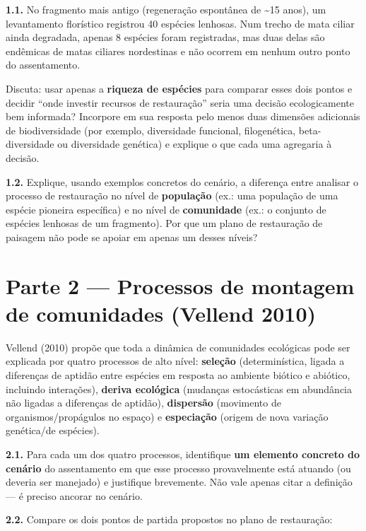 \documentclass[
  brazilian,
  letterpaper,
  DIV=11,
  numbers=noendperiod]{scrartcl}
\begin{document}
\textbf{1.1.} No fragmento mais antigo (regeneração espontânea de
\textasciitilde15 anos), um levantamento florístico registrou 40
espécies lenhosas. Num trecho de mata ciliar ainda degradada, apenas 8
espécies foram registradas, mas duas delas são endêmicas de matas
ciliares nordestinas e não ocorrem em nenhum outro ponto do
assentamento.

Discuta: usar apenas a \textbf{riqueza de espécies} para comparar esses
dois pontos e decidir ``onde investir recursos de restauração'' seria
uma decisão ecologicamente bem informada? Incorpore em sua resposta pelo
menos duas dimensões adicionais de biodiversidade (por exemplo,
diversidade funcional, filogenética, beta-diversidade ou diversidade
genética) e explique o que cada uma agregaria à decisão.

\textbf{1.2.} Explique, usando exemplos concretos do cenário, a
diferença entre analisar o processo de restauração no nível de
\textbf{população} (ex.: uma população de uma espécie pioneira
específica) e no nível de \textbf{comunidade} (ex.: o conjunto de
espécies lenhosas de um fragmento). Por que um plano de restauração de
paisagem não pode se apoiar em apenas um desses níveis?

\section{Parte 2 --- Processos de montagem de comunidades (Vellend
2010)}\label{parte-2-processos-de-montagem-de-comunidades-vellend-2010}

Vellend (2010) propõe que toda a dinâmica de comunidades ecológicas pode
ser explicada por quatro processos de alto nível: \textbf{seleção}
(determinística, ligada a diferenças de aptidão entre espécies em
resposta ao ambiente biótico e abiótico, incluindo interações),
\textbf{deriva ecológica} (mudanças estocásticas em abundância não
ligadas a diferenças de aptidão), \textbf{dispersão} (movimento de
organismos/propágulos no espaço) e \textbf{especiação} (origem de nova
variação genética/de espécies).

\textbf{2.1.} Para cada um dos quatro processos, identifique \textbf{um
elemento concreto do cenário} do assentamento em que esse processo
provavelmente está atuando (ou deveria ser manejado) e justifique
brevemente. Não vale apenas citar a definição --- é preciso ancorar no
cenário.

\textbf{2.2.} Compare os dois pontos de partida propostos no plano de
restauração:
\end{document}
